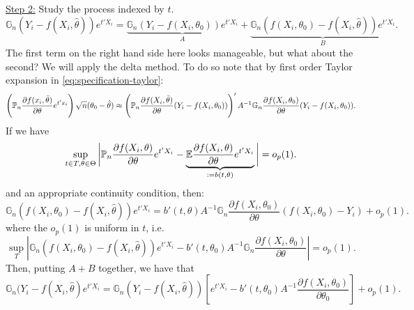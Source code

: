 \begin{example*}
	\underline{Step 2:} Study the process indexed by \(t\).
	\[
		\mathbb{G}_n (Y_i - f(X_i,\hat\theta))e^{t'X_i} = \underbrace{\mathbb{G}_n (Y_i - f(X_i,\theta_0))e^{t'X_i}}_{A} + \underbrace{\mathbb{G}_n(f(X_i,\theta_0)-f(X_i,\hat\theta))e^{t'X_i}}_{B}
	.\]
	The first term on the right hand side here looks manageable, but what about the second? We will apply the delta method. To do so note that by first order Taylor expansion in \eqref{eq:specification-taylor}:
	\[
		\left(\P_n\frac{\partial f(x_i,\bar\theta)}{\partial \theta}e^{t'x_i}\right)\sqrt{n}(\theta_0-\hat\theta) \approx  \left(\P_n\frac{\partial f(X_i,\bar\theta)}{\partial \theta}(Y_i-f(X_i,\theta_0))\right)'A^{-1}\mathbb{G}_n\frac{\partial f(X_i,\theta_0)}{\partial \theta}(Y_i-f(X_i,\theta_0))
	.\]
	If we have 
	\[
		\sup_{t\in T,\theta\in\Theta} \bigg|\P_n \frac{\partial  f(X_i,\theta)}{\partial \theta}e^{t'X_i} - \underbrace{\E\frac{\partial  f(X_i,\theta)}{\partial \theta}e^{t'X_i}}_{:=b(t,\theta)}\bigg| = o_p(1)
	.\]
	and an appropriate continuity condition, then:
	\[
		\mathbb{G}_n(f(X_i,\theta_0)-f(X_i,\hat\theta))e^{t'X_i} = b'(t,\theta)A^{-1}\mathbb{G}_n\frac{\partial f(X_i,\theta_0)}{\partial \theta}(f(X_i,\theta_0)-Y_i) + o_p(1)
	.\] 
	where the \(o_p(1)\) is uniform in \(t\), i.e.
	\[
		\sup_T \left|\mathbb{G}_n (f(X_i,\theta_0)-f(X_i,\hat\theta))e^{t'X_i} - b'(t,\theta_0)A^{-1}\mathbb{G}_n\frac{\partial f(X_i,\theta_0)}{\partial \theta}\right| = o_p(1)
	.\]
	Then, putting \(A+B\) together, we have that 
	\[
		\mathbb{G}_n(Y_i-f(X_i,\hat\theta)e^{t'X_i} = \mathbb{G}_n (Y_i - f(X_i,\hat\theta))\left[e^{t'X_i}-b'(t,\theta_0)A^{-1}\frac{\partial f(X_i,\theta_0)}{\partial \theta_0}\right] + o_p(1)\tag{S2}
	.\]


\end{example*}
